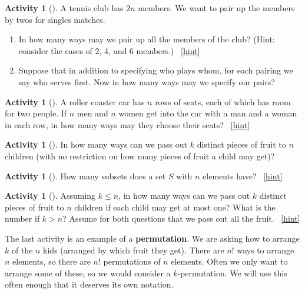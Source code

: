 \documentclass[10pt,]{book}
\newcommand{\terminology}[1]{\textbf{#1}}
\theoremstyle{plain}
\theoremstyle{definition}
\theoremstyle{definition}
\theoremstyle{definition}
\newtheorem{activity}[project]{Activity}
\numberwithin{equation}{chapter}
\begin{document}
\begin{activity}[]\label{tennispairings1}
\hypertarget{p-191}{}%
A tennis club has \(2n\) members. We want to pair up the members by twos for singles matches.%
\begin{enumerate}[font=\bfseries,label=(\alph*),ref=\alph*]
\item\label{task-62} \hypertarget{p-192}{}%
In how many ways may we pair up all the members of the club? (Hint: consider the cases of 2, 4, and 6 members.)%
~\hfill{\tiny\hyperlink{a-24.a}{[hint]}\hypertarget{q-24.a}{}}\item\label{task-63} \hypertarget{p-195}{}%
Suppose that in addition to specifying who plays whom, for each pairing we say who serves first.  Now in how many ways may we specify our pairs?%
\end{enumerate}
\end{activity}
\begin{activity}[]\label{activity-25}
\hypertarget{p-196}{}%
A roller coaster car has \(n\) rows of seats, each of which has room for two people. If \(n\) men and \(n\) women get into the car with a man and a woman in each row, in how many ways may they choose their seats?%
~\hfill{\tiny\hyperlink{a-25}{[hint]}\hypertarget{q-25}{}}\end{activity}
\begin{activity}[]\label{activity-26}
\hypertarget{p-199}{}%
In how many ways can we pass out \(k\) distinct pieces of fruit to \(n\) children (with no restriction on how many pieces of fruit a child may get)?%
\end{activity}
\begin{activity}[]\label{SubsetsFirstTime}
\hypertarget{p-201}{}%
How many subsets does a set \(S\) with \(n\) elements have?%
~\hfill{\tiny\hyperlink{a-27}{[hint]}\hypertarget{q-27}{}}\end{activity}
\begin{activity}[]\label{activity-28}
\hypertarget{p-204}{}%
Assuming \(k\le n\), in how many ways can we pass out \(k\) distinct pieces of fruit to \(n\) children if each child may get at most one? What is the number if \(k>n\)? Assume for both questions that we pass out all the fruit.%
~\hfill{\tiny\hyperlink{a-28}{[hint]}\hypertarget{q-28}{}}\end{activity}
\hypertarget{p-208}{}%
The last activity is an example of a \terminology{permutation}.  We are asking how to arrange \(k\) of the \(n\) kids (arranged by which fruit they get).  There are \(n!\) ways to arrange \(n\) elements, so there are \(n!\) permutations of \(n\) elements.  Often we only want to arrange some of these, so we would consider a \(k\)-permutation.   We will use this often enough that it deserves its own notation.%
\end{document}
